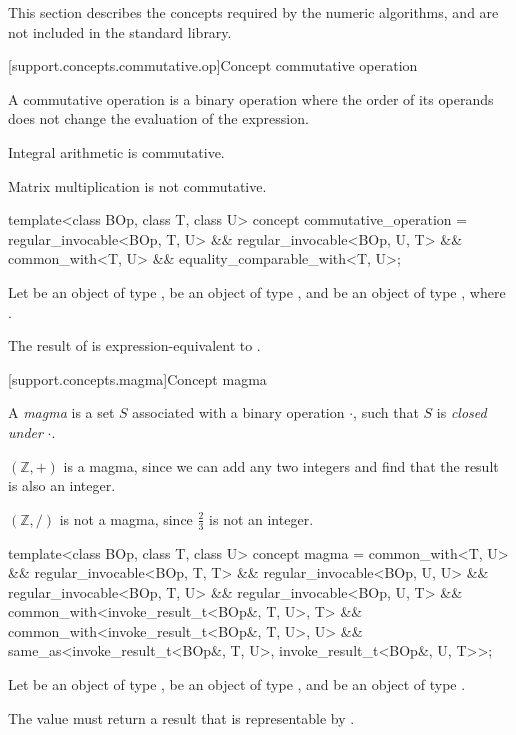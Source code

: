 This section describes the concepts required by the numeric algorithms, and are not included in the
\Cpp standard library.

[support.concepts.commutative.op]{Concept commutative operation}

\pnum
A commutative operation is a binary operation where the order of its operands does not change the
evaluation of the expression.

\pnum
\begin{example}
   Integral arithmetic is commutative.
\end{example}

\pnum
\begin{example}
   Matrix multiplication is not commutative.
\end{example}

\begin{itemdecl}
  template<class BOp, class T, class U>
  concept commutative_operation =
    regular_invocable<BOp, T, U> &&
    regular_invocable<BOp, U, T> &&
    common_with<T, U> &&
    equality_comparable_with<T, U>;
\end{itemdecl}
\begin{itemdescr}
   \pnum
   Let  be an object of type ,  be an object of type , and
    be an object of type , where .

   \pnum
   The result of  is expression-equivalent to .
\end{itemdescr}

[support.concepts.magma]{Concept magma}

\pnum
A \textit{magma} is a set $S$ associated with a binary operation $\cdot$, such that $S$ is
\textit{closed under} $\cdot$.

\pnum
\begin{example}
   $(\mathbb{Z}, +)$ is a magma, since we can add any two integers and find that the result is also
   an integer.
\end{example}

\pnum
\begin{example}
   $(\mathbb{Z}, /)$ is not a magma, since $\frac{2}{3}$ is not an integer.
\end{example}

\begin{itemdecl}
  template<class BOp, class T, class U>
  concept magma =
    common_with<T, U> &&
    regular_invocable<BOp, T, T> &&
    regular_invocable<BOp, U, U> &&
    regular_invocable<BOp, T, U> &&
    regular_invocable<BOp, U, T> &&
    common_with<invoke_result_t<BOp&, T, U>, T> &&
    common_with<invoke_result_t<BOp&, T, U>, U> &&
    same_as<invoke_result_t<BOp&, T, U>, invoke_result_t<BOp&, U, T>>;
\end{itemdecl}
\begin{itemdescr}
   \pnum
   Let  be an object of type ,  be an object of type , and
    be an object of type .

   \pnum
   The value  must return a result that is representable by
   .
\end{itemdescr}

